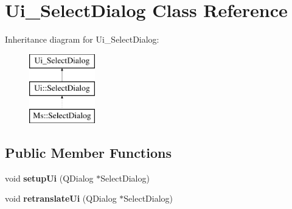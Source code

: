 \hypertarget{class_ui___select_dialog}{}\section{Ui\+\_\+\+Select\+Dialog Class Reference}
\label{class_ui___select_dialog}
Inheritance diagram for Ui\+\_\+\+Select\+Dialog\+:\begin{figure}[H]
\begin{center}
\leavevmode
\includegraphics[height=3.000000cm]{class_ui___select_dialog}
\end{center}
\end{figure}
\subsection*{Public Member Functions}
\begin{DoxyCompactItemize}
\item 
\mbox{\label{class_ui___select_dialog_abdb56e4111bc4c1a3145811084647974}} 
void {\bfseries setup\+Ui} (Q\+Dialog $\ast$Select\+Dialog)
\item 
\mbox{\label{class_ui___select_dialog_ae7dbc45a4f195c5b3f05abaac2c9f237}} 
void {\bfseries retranslate\+Ui} (Q\+Dialog $\ast$Select\+Dialog)
\end{DoxyCompactItemize}
